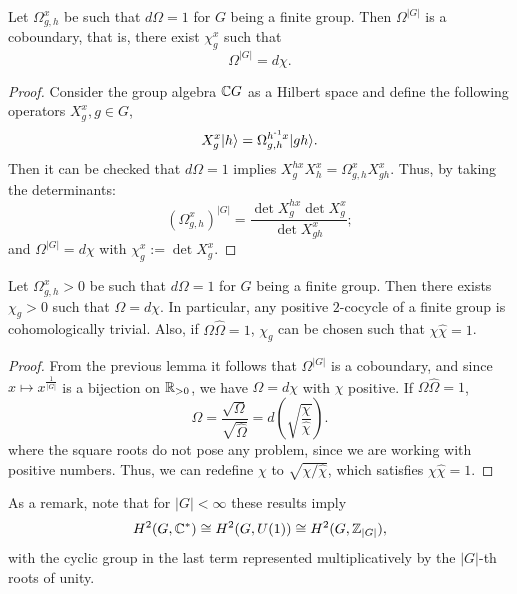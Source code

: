 \documentclass[reprint,
superscriptaddress,
amsmath,amssymb,
notitlepage,
aps,
prb,
10pt, 
tightenlines
]{revtex4-2}
\begin{document}
\begin{lemma}
    Let $\Omega^x_{g,h}$ be such that $d\Omega =1$ for $G$ being a finite group. Then $\Omega^{|G|}$ is a coboundary, that is, there exist $\chi^x_g$ such that 
    \begin{equation}
        \Omega^{|G|}=d\chi.
    \end{equation}
    \label{lemma:G_cocycle}
\end{lemma}
\begin{proof}
    Consider the group algebra $\mathbb{C} G$ as a Hilbert space and define the following operators $X^x_g, g\in G$,
    \begin{equation}
        X^x_g|h\rangle=\Omega^{h^{\text{-}1}x}_{g,h}|gh\rangle.
    \end{equation}
    Then it can be checked that $d\Omega=1$ implies $X^{hx}_gX^{x}_h = \Omega^x_{g,h}X^{x}_{gh}$. Thus, by taking the determinants: 
    \begin{equation}
        \left(\Omega^x_{g,h}\right)^{|G|} = \dfrac{\det{X^{hx}_{g}}\det{X^{x}_{g}}}{\det{X^{x}_{gh}}};
    \end{equation}
    and $\Omega^{|G|}=d\chi$ with $\chi^x_g:=\det{X^x_g}$. 
\end{proof}

\begin{corollary}
    Let $\Omega^x_{g,h}>0$ be such that $d\Omega =1$ for $G$ being a finite group. Then there exists $\chi_g>0$ such that $\Omega=d\chi$. In particular, any positive $2$-cocycle of a finite group is cohomologically trivial. Also, if $\Omega\hat\Omega=1$, $\chi_g$ can be chosen such that $\chi\hat\chi=1$.
    \label{cor:positive_trivial}
\end{corollary}
\begin{proof}
    From the previous lemma it follows that $\Omega^{|G|}$ is a coboundary, and since $x\mapsto x^{\frac{1}{|G|}}$ is a bijection on $\mathbb{R}_{>0}$, we have $\Omega=d\chi$ with $\chi$ positive. If $\Omega\hat\Omega=1$,
    \begin{equation}
        \Omega=\dfrac{\sqrt{\Omega}}{\sqrt{\hat\Omega}} = d\left(\sqrt{\dfrac{\chi}{\hat\chi}}\right).
    \end{equation}
    where the square roots do not pose any problem, since we are working with positive numbers. Thus, we can redefine $\chi$ to $\sqrt{\chi/\hat\chi}$, which satisfies $\chi\hat\chi=1$.
\end{proof}
As a remark, note that for $|G|<\infty$ these results imply
\begin{equation}
    H^2(G, \mathbb{C}^*)\cong H^2(G, U(1)) \cong H^2(G, \mathbb{Z}_{|G|}),
\end{equation}
with the cyclic group in the last term represented multiplicatively by the $|G|$-th roots of unity. 
\end{document}
